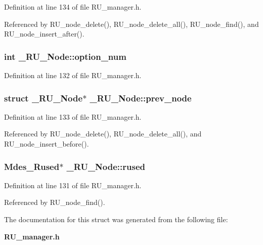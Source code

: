 Definition at line 134 of file RU\_\-manager.h.

Referenced by RU\_\-node\_\-delete(), RU\_\-node\_\-delete\_\-all(), RU\_\-node\_\-find(), and RU\_\-node\_\-insert\_\-after().
\subsubsection{\setlength{\rightskip}{0pt plus 5cm}int \bf{\_\-RU\_\-Node::option\_\-num}}\label{struct__RU__Node_3003e03711b4c1cc067942e6d7d06e16}




Definition at line 132 of file RU\_\-manager.h.
\subsubsection{\setlength{\rightskip}{0pt plus 5cm}struct \bf{\_\-RU\_\-Node}$\ast$ \bf{\_\-RU\_\-Node::prev\_\-node}}\label{struct__RU__Node_4e0a9379ea9e27097d583af68e34667e}




Definition at line 133 of file RU\_\-manager.h.

Referenced by RU\_\-node\_\-delete(), RU\_\-node\_\-delete\_\-all(), and RU\_\-node\_\-insert\_\-before().
\subsubsection{\setlength{\rightskip}{0pt plus 5cm}Mdes\_\-Rused$\ast$ \bf{\_\-RU\_\-Node::rused}}\label{struct__RU__Node_87d0a81e4c56b835f6d1731c6dfcce0c}




Definition at line 131 of file RU\_\-manager.h.

Referenced by RU\_\-node\_\-find().

The documentation for this struct was generated from the following file:\begin{CompactItemize}
\item 
\bf{RU\_\-manager.h}\end{CompactItemize}
